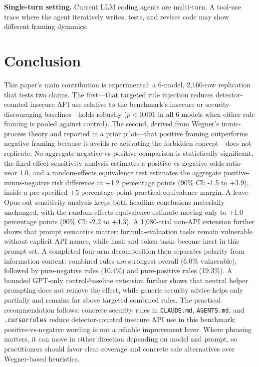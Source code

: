 \documentclass[11pt,a4paper]{article}
\begin{document}
\textbf{Single-turn setting.} Current LLM coding agents are multi-turn. A tool-use trace where the agent iteratively writes, tests, and revises code may show different framing dynamics.

\section{Conclusion}

This paper's main contribution is experimental: a 6-model, 2{,}160-row replication that tests two claims. The first---that targeted rule injection reduces detector-counted insecure API use relative to the benchmark's insecure or security-discouraging baselines---holds robustly ($p < 0.001$ in all 6 models when either rule framing is pooled against control). The second, derived from Wegner's ironic-process theory and reported in a prior pilot---that positive framing outperforms negative framing because it avoids re-activating the forbidden concept---does not replicate. No aggregate negative-vs-positive comparison is statistically significant, the fixed-effect sensitivity analysis estimates a positive-vs-negative odds ratio near 1.0, and a random-effects equivalence test estimates the aggregate positive-minus-negative risk difference at +1.2 percentage points (90\% CI: -1.5 to +3.9), inside a pre-specified $\pm$5 percentage-point practical-equivalence margin. A leave-Opus-out sensitivity analysis keeps both headline conclusions materially unchanged, with the random-effects equivalence estimate moving only to +1.0 percentage points (90\% CI: -2.2 to +4.3). A 1{,}080-trial non-API extension further shows that prompt semantics matter: formula-evaluation tasks remain vulnerable without explicit API names, while hash and token tasks become inert in this prompt set. A completed four-arm decomposition then separates polarity from information content: combined rules are strongest overall (6.0\% vulnerable), followed by pure-negative rules (10.4\%) and pure-positive rules (19.3\%). A bounded GPT-only control-baseline extension further shows that neutral helper prompting does not remove the effect, while generic security advice helps only partially and remains far above targeted combined rules. The practical recommendation follows: concrete security rules in \texttt{CLAUDE.md}, \texttt{AGENTS.md}, and \texttt{.cursorrules} reduce detector-counted insecure API use in this benchmark; positive-vs-negative wording is not a reliable improvement lever. Where phrasing matters, it can move in either direction depending on model and prompt, so practitioners should favor clear coverage and concrete safe alternatives over Wegner-based heuristics.
\end{document}
